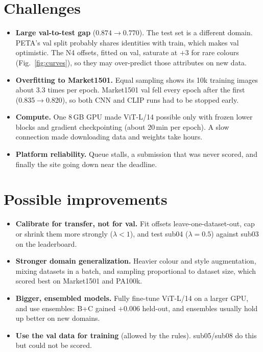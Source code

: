 \documentclass[10pt,a4paper]{article}
\begin{document}
\section{Challenges}
\begin{itemize}
\item \textbf{Large val-to-test gap} ($0.874\rightarrow0.770$). The test set is a different domain. PETA's val split probably shares
identities with train, which makes val optimistic. The N4 offsets, fitted on val, saturate at $+3$ for rare colours (Fig.~\ref{fig:curves}),
so they may over-predict those attributes on new data.
\item \textbf{Overfitting to Market1501.} Equal sampling shows its 10k training images about 3.3 times per epoch. Market1501 val fell every epoch
after the first (0.835$\rightarrow$0.820), so both CNN and CLIP runs had to be stopped early.
\item \textbf{Compute.} One 8\,GB GPU made ViT-L/14 possible only with frozen lower blocks and gradient checkpointing (about 20\,min per epoch).
A slow connection made downloading data and weights take hours.
\item \textbf{Platform reliability.} Queue stalls, a submission that was never scored, and finally the site going down near the deadline.
\end{itemize}

\section{Possible improvements}
\begin{itemize}
\item \textbf{Calibrate for transfer, not for val.} Fit offsets leave-one-dataset-out, cap or shrink them more strongly ($\lambda<1$),
and test sub04 ($\lambda=0.5$) against sub03 on the leaderboard.
\item \textbf{Stronger domain generalization.} Heavier colour and style augmentation, mixing datasets in a batch,
and sampling proportional to dataset size, which scored best on Market1501 and PA100k.
\item \textbf{Bigger, ensembled models.} Fully fine-tune ViT-L/14 on a larger GPU, and use ensembles: B+C gained $+0.006$ held-out,
and ensembles usually hold up better on new domains.
\item \textbf{Use the val data for training} (allowed by the rules). sub05/sub08 do this but could not be scored.
\end{itemize}
\end{document}
